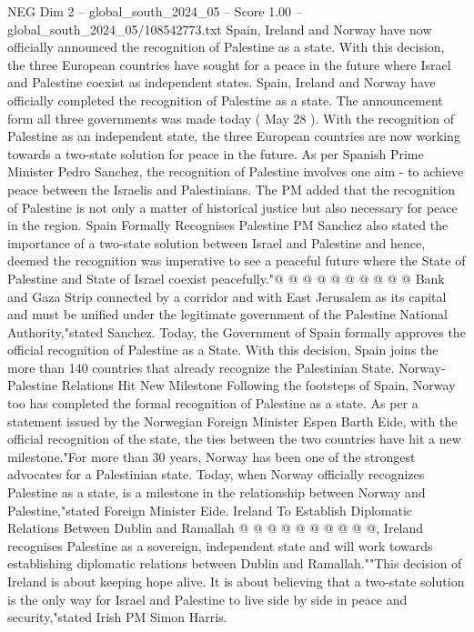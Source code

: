 \begin{textsample}{NEG Dim 2 – global\_south\_2024\_05 – Score 1.00 – global\_south\_2024\_05/108542773.txt}  \label{ex:f2_neg_372}
Spain, Ireland and Norway have now officially announced the recognition of Palestine as a state.
With this decision, the three European countries have sought for a peace in the future where Israel and Palestine coexist as independent states.
Spain, Ireland and Norway have officially completed the recognition of Palestine as a state.
The announcement form all three governments was made today ( May 28 ).
With the recognition of Palestine as an independent state, the three European countries are now working towards a two-state solution for peace in the future.
As per Spanish Prime Minister Pedro Sanchez, the recognition of Palestine involves one aim - to achieve peace between the Israelis and Palestinians.
The PM added that the recognition of Palestine is not only a matter of historical justice but also necessary for peace in the region.
Spain Formally Recognises Palestine PM Sanchez also stated the importance of a two-state solution between Israel and Palestine and hence, deemed the recognition was imperative to see a peaceful future where the State of Palestine and State of Israel coexist peacefully."@ @ @ @ @ @ @ @ @ @ Bank and Gaza Strip connected by a corridor and with East Jerusalem as its capital and must be unified under the legitimate government of the Palestine National Authority,"stated Sanchez.
Today, the Government of Spain formally approves the official recognition of Palestine as a State.
With this decision, Spain joins the more than 140 countries that already recognize the Palestinian State.
Norway-Palestine Relations Hit New Milestone Following the footsteps of Spain, Norway too has completed the formal recognition of Palestine as a state.
As per a statement issued by the Norwegian Foreign Minister Espen Barth Eide, with the official recognition of the state, the ties between the two countries have hit a new milestone."For more than 30 years, Norway has been one of the strongest advocates for a Palestinian state.
Today, when Norway officially recognizes Palestine as a state, is a milestone in the relationship between Norway and Palestine,"stated Foreign Minister Eide.
Ireland To Establish Diplomatic Relations Between Dublin and Ramallah @ @ @ @ @ @ @ @ @ @, Ireland recognises Palestine as a sovereign, independent state and will work towards establishing diplomatic relations between Dublin and Ramallah.""This decision of Ireland is about keeping hope alive.
It is about believing that a two-state solution is the only way for Israel and Palestine to live side by side in peace and security,"stated Irish PM Simon Harris.

\end{textsample}
